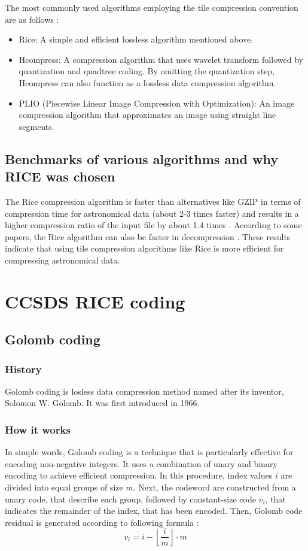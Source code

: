 \documentclass[licencjacka,en]{pracamgr}
\begin{document}
The most commonly used algorithms employing the tile compression convention are as follows \cite{rice-comp}:

\begin{itemize}
\item Rice: A simple and efficient lossless algorithm mentioned above.
\item Hcompress: A compression algorithm that uses wavelet transform followed by quantization and quadtree coding. By omitting the quantization step, Hcompress can also function as a lossless data compression algorithm.
\item PLIO (Piecewise Linear Image Compression with Optimization): An image compression algorithm that approximates an image using straight line segments.
\end{itemize}

\subsection{Benchmarks of various algorithms and why RICE was chosen}
The Rice compression algorithm is faster than alternatives like GZIP in terms of compression time for astronomical data (about 2-3 times faster) and results in a higher compression ratio of the input file by about 1.4 times \cite{rice-comp}. According to some papers, the Rice algorithm can also be faster in decompression \cite{why-rice}. These results indicate that using tile compression algorithms like Rice is more efficient for compressing astronomical data.

\section{CCSDS RICE coding}

\subsection{Golomb coding}
\subsubsection{History}
Golomb coding is losless data compression method named after its inventor, Solomon W. Golomb. It was first introduced in 1966. \cite{golomb-original}
\subsubsection{How it works}
In simple words, Golomb coding is a technique that is particularly effective for encoding non-negative integers. It uses a combination of unary and binary encoding to achieve efficient compression. In this procedure, index values $i$ are divided into equal groups of size $m$. \cite{golomb-coding-work} Next, the codeword are constructed from a unary code, that describe each group, followed by constant-size code $v_i$, that indicates the remainder of the index, that has been encoded.  Then, Golomb code residual is generated according to following formula \cite{golomb-coding-work}:
$$v_i = i - \left\lfloor\frac{i}{m}\right\rfloor \cdot m$$
\end{document}
